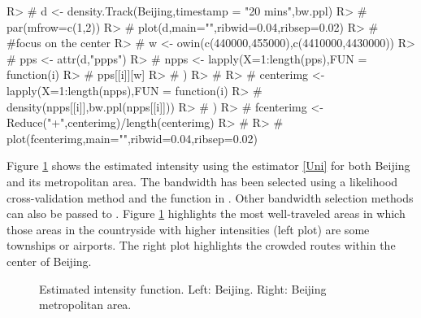 \documentclass[article]{jss}
\begin{document}
\begin{Schunk}
\begin{Sinput}
R> # d <- density.Track(Beijing,timestamp = "20 mins",bw.ppl)
R> # par(mfrow=c(1,2))
R> # plot(d,main="",ribwid=0.04,ribsep=0.02)
R> # #focus on the center
R> # w <- owin(c(440000,455000),c(4410000,4430000))
R> # pps <- attr(d,"ppps")
R> # npps <- lapply(X=1:length(pps),FUN = function(i){
R> #   pps[[i]][w]
R> # })
R> # 
R> # centerimg <- lapply(X=1:length(npps),FUN = function(i){
R> #   density(npps[[i]],bw.ppl(npps[[i]]))
R> # })
R> # fcenterimg <- Reduce("+",centerimg)/length(centerimg)
R> # 
R> # plot(fcenterimg,main="",ribwid=0.04,ribsep=0.02)
\end{Sinput}
\end{Schunk}
Figure \ref{bijingint} shows the estimated intensity using the estimator \eqref{Uni} for both Beijing and its metropolitan area. The bandwidth has been selected using a likelihood cross-validation method and the function  in . Other bandwidth selection methods can also be passed to . Figure \ref{bijingint} highlights the most well-traveled areas in which those areas in the countryside with higher intensities (left plot) are some townships or airports. The right plot highlights the crowded routes within the center of Beijing.
  \begin{figure}[!h]
  \centering
  \caption{Estimated intensity function. Left: Beijing. Right: Beijing metropolitan area.}
  \label{bijingint}
  \end{figure}
\end{document}
